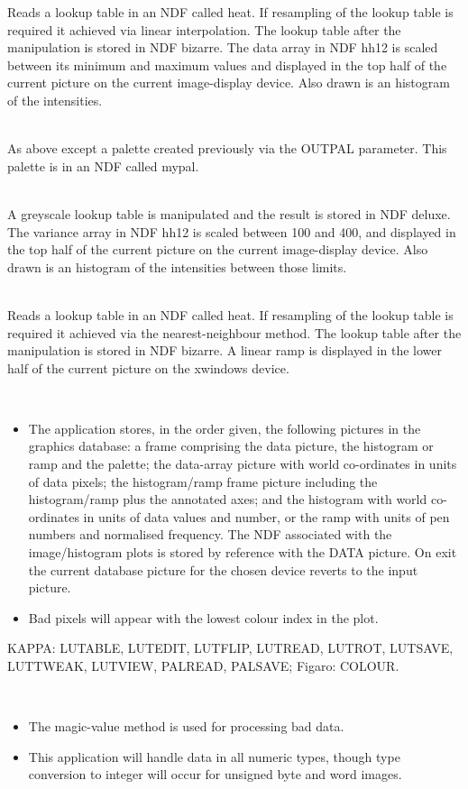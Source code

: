 \documentclass[twoside,11pt]{article}
\newcommand{\sstexamplesubsection}[2]{\sloppy \item{\ssttt #1} \mbox{} \\ #2 }
\newcommand{\sstnotes}[1]{\pagebreak[3] \item[Notes:] \mbox{} \\[1.3ex] #1}
\newcommand{\sstdiytopic}[2]{\goodbreak \item[{\hspace{-0.35em}#1\hspace{-0.35em}:}] \mbox{} \\[1.3ex] #2}
\newcommand{\sstimplementationstatus}[1]{
   \pagebreak[3] \item[{Implementation Status:}] \mbox{} \\[1.3ex] #1}
\newenvironment{sstitemize}{%
  \vspace{-4.3ex}\begin{itemize}}{\end{itemize}}
\newcommand{\sstitemlist}[1]{
  \mbox{} \\
  \vspace{-3.5ex}
  \begin{sstitemize}
     #1
  \end{sstitemize}
}
\newcommand{\sstitem}{\item}
\newcommand{\ssttt}{\tt}
\renewcommand{\sstexamplesubsection}[2]{\item[{\ssttt #1}] \\ #2}
\renewcommand{\sstnotes}[1]{\item[Notes:]
      \begin{description}
         #1
      \end{description}
   }
\renewcommand{\sstdiytopic}[2]{\item[{#1}]
      \begin{description}
         #2
      \end{description}
   }
\renewcommand{\sstimplementationstatus}[1]{\item[Implementation Status:] 
      \begin{description}
         #1
      \end{description}
   }
\newcommand{\sstitemlist}[1]{
      \begin{itemize}
         #1
      \end{itemize}
   }
\begin{document}
{{{      }{
         Reads a lookup table in an NDF called heat.  If resampling of
         the lookup table is required it achieved via linear
         interpolation. The lookup table after the manipulation is
         stored in NDF bizarre.  The data array in NDF hh12 is scaled
         between its minimum and maximum values and displayed in the
         top half of the current picture on the current image-display
         device.  Also drawn is an histogram of the intensities.
      }
      \sstexamplesubsection{
         crelut heat bizarre hh12 inpal=mypal $\backslash$
      }{
         As above except a palette created previously via the OUTPAL
         parameter.  This palette is in an NDF called mypal.
      }
      \sstexamplesubsection{
         crelut inlut=! deluxe hh12 v low=100 high=400 $\backslash$
      }{
         A greyscale lookup table is manipulated and the result
         is stored in NDF deluxe.  The variance array in NDF hh12 is
         scaled between 100 and 400, and displayed in the top half of
         the current picture on the current image-display device.  Also
         drawn is an histogram of the intensities between those limits.
      }
      \sstexamplesubsection{
         crelut heat bizarre ndf=! device=xwindows $\backslash$
      }{
         Reads a lookup table in an NDF called heat.  If resampling of
         the lookup table is required it achieved via the
         nearest-neighbour method.  The lookup table after the
         manipulation is stored in NDF bizarre.  A linear ramp is
         displayed in the lower half of the current picture on the
         xwindows device.
      }
   }
   \sstnotes{
      \sstitemlist{

         \sstitem
         The application stores, in the order given, the following
         pictures in the graphics database: a frame comprising the data
         picture, the histogram or ramp and the palette; the data-array
         picture with world co-ordinates in units of data pixels; the
         histogram/ramp frame picture including the histogram/ramp plus
         the annotated axes; and the histogram with world co-ordinates in
         units of data values and number, or the ramp with units of pen
         numbers and normalised frequency.  The NDF associated with the
         image/histogram plots is stored by reference with the DATA
         picture.  On exit the current database picture for the chosen
         device reverts to the input picture.

         \sstitem
         Bad pixels will appear with the lowest colour index in the
         plot.
      }
   }
   \sstdiytopic{
      Related Applications
   }{
      KAPPA: LUTABLE, LUTEDIT, LUTFLIP, LUTREAD, LUTROT, LUTSAVE, LUTTWEAK, \linebreak
      LUTVIEW, PALREAD, PALSAVE; Figaro: COLOUR.
   }
   \sstimplementationstatus{
      \sstitemlist{

         \sstitem
         The magic-value method is used for processing bad data.

         \sstitem
         This application will handle data in all numeric types, though
         type conversion to integer will occur for unsigned byte and word
         images.
      }
   }
}
\end{document}
